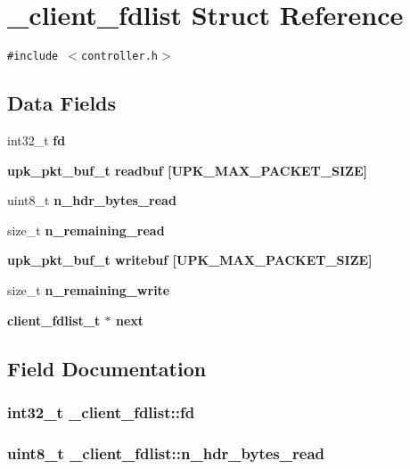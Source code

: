 \section{\_\-client\_\-fdlist Struct Reference}
\label{struct__client__fdlist}
{\tt \#include $<$controller.h$>$}

\subsection*{Data Fields}
\begin{CompactItemize}
\item 
int32\_\-t \bf{fd}
\item 
\bf{upk\_\-pkt\_\-buf\_\-t} \bf{readbuf} [UPK\_\-MAX\_\-PACKET\_\-SIZE]
\item 
uint8\_\-t \bf{n\_\-hdr\_\-bytes\_\-read}
\item 
size\_\-t \bf{n\_\-remaining\_\-read}
\item 
\bf{upk\_\-pkt\_\-buf\_\-t} \bf{writebuf} [UPK\_\-MAX\_\-PACKET\_\-SIZE]
\item 
size\_\-t \bf{n\_\-remaining\_\-write}
\item 
\bf{client\_\-fdlist\_\-t} $\ast$ \bf{next}
\end{CompactItemize}


\subsection{Field Documentation}
\subsubsection{\setlength{\rightskip}{0pt plus 5cm}int32\_\-t \bf{\_\-client\_\-fdlist::fd}}\label{struct__client__fdlist_3bea0577595a1f59d1582a1c56ffe61b}


\subsubsection{\setlength{\rightskip}{0pt plus 5cm}uint8\_\-t \bf{\_\-client\_\-fdlist::n\_\-hdr\_\-bytes\_\-read}}\label{struct__client__fdlist_83d7da00b85d06e2b49ce29d1a177b89}


